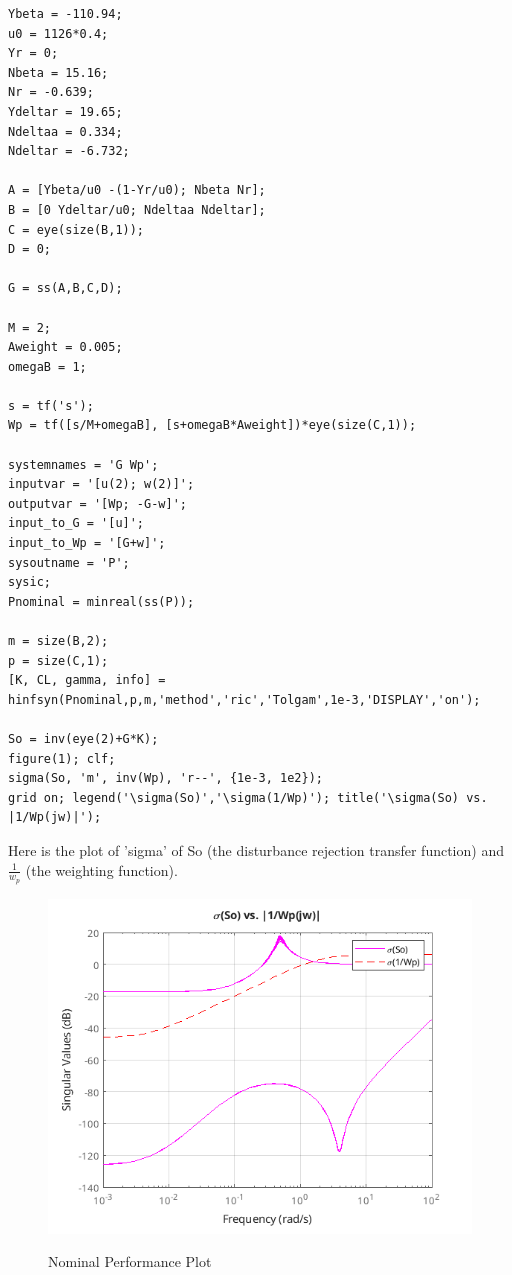 \documentclass{article}
\begin{document}
\begin{lstlisting}[style=matlabstyle]
Ybeta = -110.94;
u0 = 1126*0.4;
Yr = 0;
Nbeta = 15.16;
Nr = -0.639;
Ydeltar = 19.65;
Ndeltaa = 0.334;
Ndeltar = -6.732;

A = [Ybeta/u0 -(1-Yr/u0); Nbeta Nr];
B = [0 Ydeltar/u0; Ndeltaa Ndeltar];
C = eye(size(B,1));
D = 0;

G = ss(A,B,C,D);

M = 2;
Aweight = 0.005;
omegaB = 1;

s = tf('s');
Wp = tf([s/M+omegaB], [s+omegaB*Aweight])*eye(size(C,1));

systemnames = 'G Wp';
inputvar = '[u(2); w(2)]';
outputvar = '[Wp; -G-w]';
input_to_G = '[u]';
input_to_Wp = '[G+w]';
sysoutname = 'P';
sysic;
Pnominal = minreal(ss(P));

m = size(B,2);
p = size(C,1);
[K, CL, gamma, info] = hinfsyn(Pnominal,p,m,'method','ric','Tolgam',1e-3,'DISPLAY','on');

So = inv(eye(2)+G*K);
figure(1); clf;
sigma(So, 'm', inv(Wp), 'r--', {1e-3, 1e2});
grid on; legend('\sigma(So)','\sigma(1/Wp)'); title('\sigma(So) vs. |1/Wp(jw)|');    
\end{lstlisting}

Here is the plot of 'sigma' of So (the disturbance rejection transfer function) and $\frac{1}{w_p}$ (the weighting function).

\begin{figure}[H]
    \centering
    \includegraphics[width=\textwidth]{3np.png}
    \label{fig:3np}
    \caption{Nominal Performance Plot}
\end{figure}
\end{document}
